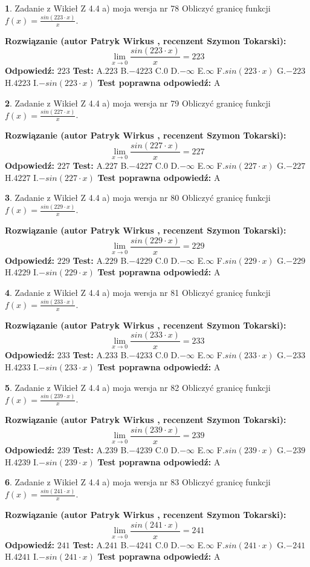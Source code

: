 \documentclass[12pt, a4paper]{article}
\theoremstyle{definition} %
\newtheorem{zad}{}
\newcommand{\zadStart}[1]{\begin{zad}#1\newline}
\newcommand{\zadStop}{\end{zad}}
\newcommand{\rozwStart}[2]{\noindent \textbf{Rozwiązanie (autor #1 , recenzent #2): }\newline}
\newcommand{\rozwStop}{\newline}
\newcommand{\odpStart}{\noindent \textbf{Odpowiedź:}\newline}
\newcommand{\odpStop}{\newline}
\newcommand{\testStart}{\noindent \textbf{Test:}\newline}
\newcommand{\testStop}{\newline}
\newcommand{\kluczStart}{\noindent \textbf{Test poprawna odpowiedź:}\newline}
\newcommand{\kluczStop}{\newline}
\begin{document}
\zadStart{Zadanie z Wikieł Z 4.4 a) moja wersja nr 78}
Obliczyć granicę funkcji $f(x)=\frac{sin(223\cdot x)}{x}$.
\zadStop
\rozwStart{Patryk Wirkus}{Szymon Tokarski}
$$\lim\limits_{x\to 0}\frac{sin(223\cdot x)}{x}=
223$$
\rozwStop
\odpStart
$223$
\odpStop
\testStart
A.$223$
B.$-4223$
C.$0$
D.$-\infty$
E.$\infty$
F.$sin(223\cdot x)$
G.$-223$
H.$4223$
I.$-sin(223\cdot x)$
\testStop
\kluczStart
A
\kluczStop



\zadStart{Zadanie z Wikieł Z 4.4 a) moja wersja nr 79}
Obliczyć granicę funkcji $f(x)=\frac{sin(227\cdot x)}{x}$.
\zadStop
\rozwStart{Patryk Wirkus}{Szymon Tokarski}
$$\lim\limits_{x\to 0}\frac{sin(227\cdot x)}{x}=
227$$
\rozwStop
\odpStart
$227$
\odpStop
\testStart
A.$227$
B.$-4227$
C.$0$
D.$-\infty$
E.$\infty$
F.$sin(227\cdot x)$
G.$-227$
H.$4227$
I.$-sin(227\cdot x)$
\testStop
\kluczStart
A
\kluczStop



\zadStart{Zadanie z Wikieł Z 4.4 a) moja wersja nr 80}
Obliczyć granicę funkcji $f(x)=\frac{sin(229\cdot x)}{x}$.
\zadStop
\rozwStart{Patryk Wirkus}{Szymon Tokarski}
$$\lim\limits_{x\to 0}\frac{sin(229\cdot x)}{x}=
229$$
\rozwStop
\odpStart
$229$
\odpStop
\testStart
A.$229$
B.$-4229$
C.$0$
D.$-\infty$
E.$\infty$
F.$sin(229\cdot x)$
G.$-229$
H.$4229$
I.$-sin(229\cdot x)$
\testStop
\kluczStart
A
\kluczStop



\zadStart{Zadanie z Wikieł Z 4.4 a) moja wersja nr 81}
Obliczyć granicę funkcji $f(x)=\frac{sin(233\cdot x)}{x}$.
\zadStop
\rozwStart{Patryk Wirkus}{Szymon Tokarski}
$$\lim\limits_{x\to 0}\frac{sin(233\cdot x)}{x}=
233$$
\rozwStop
\odpStart
$233$
\odpStop
\testStart
A.$233$
B.$-4233$
C.$0$
D.$-\infty$
E.$\infty$
F.$sin(233\cdot x)$
G.$-233$
H.$4233$
I.$-sin(233\cdot x)$
\testStop
\kluczStart
A
\kluczStop



\zadStart{Zadanie z Wikieł Z 4.4 a) moja wersja nr 82}
Obliczyć granicę funkcji $f(x)=\frac{sin(239\cdot x)}{x}$.
\zadStop
\rozwStart{Patryk Wirkus}{Szymon Tokarski}
$$\lim\limits_{x\to 0}\frac{sin(239\cdot x)}{x}=
239$$
\rozwStop
\odpStart
$239$
\odpStop
\testStart
A.$239$
B.$-4239$
C.$0$
D.$-\infty$
E.$\infty$
F.$sin(239\cdot x)$
G.$-239$
H.$4239$
I.$-sin(239\cdot x)$
\testStop
\kluczStart
A
\kluczStop



\zadStart{Zadanie z Wikieł Z 4.4 a) moja wersja nr 83}
Obliczyć granicę funkcji $f(x)=\frac{sin(241\cdot x)}{x}$.
\zadStop
\rozwStart{Patryk Wirkus}{Szymon Tokarski}
$$\lim\limits_{x\to 0}\frac{sin(241\cdot x)}{x}=
241$$
\rozwStop
\odpStart
$241$
\odpStop
\testStart
A.$241$
B.$-4241$
C.$0$
D.$-\infty$
E.$\infty$
F.$sin(241\cdot x)$
G.$-241$
H.$4241$
I.$-sin(241\cdot x)$
\testStop
\kluczStart
A
\kluczStop
\end{document}
